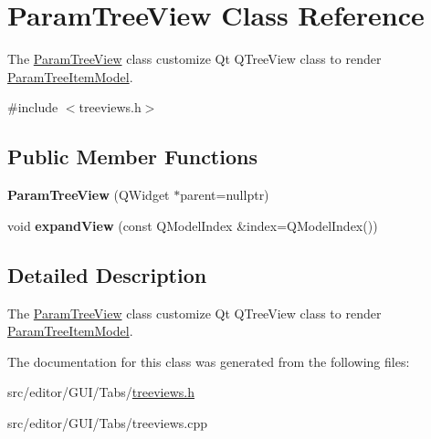 \hypertarget{class_param_tree_view}{\section{\-Param\-Tree\-View \-Class \-Reference}
\label{class_param_tree_view}
}


\-The \hyperlink{class_param_tree_view}{\-Param\-Tree\-View} class customize \-Qt \-Q\-Tree\-View class to render \hyperlink{class_param_tree_item_model}{\-Param\-Tree\-Item\-Model}.  




{\ttfamily \#include $<$treeviews.\-h$>$}

\subsection*{\-Public \-Member \-Functions}
\begin{DoxyCompactItemize}
\item 
\hypertarget{class_param_tree_view_ab4b0181a3106a05e567433c88ef46cb7}{{\bfseries \-Param\-Tree\-View} (\-Q\-Widget $\ast$parent=nullptr)}\label{class_param_tree_view_ab4b0181a3106a05e567433c88ef46cb7}

\item 
\hypertarget{class_param_tree_view_a6afd2dc7a3d5e714c516515d26443762}{void {\bfseries expand\-View} (const \-Q\-Model\-Index \&index=\-Q\-Model\-Index())}\label{class_param_tree_view_a6afd2dc7a3d5e714c516515d26443762}

\end{DoxyCompactItemize}


\subsection{\-Detailed \-Description}
\-The \hyperlink{class_param_tree_view}{\-Param\-Tree\-View} class customize \-Qt \-Q\-Tree\-View class to render \hyperlink{class_param_tree_item_model}{\-Param\-Tree\-Item\-Model}. 

\-The documentation for this class was generated from the following files\-:\begin{DoxyCompactItemize}
\item 
src/editor/\-G\-U\-I/\-Tabs/\hyperlink{treeviews_8h}{treeviews.\-h}\item 
src/editor/\-G\-U\-I/\-Tabs/treeviews.\-cpp\end{DoxyCompactItemize}
